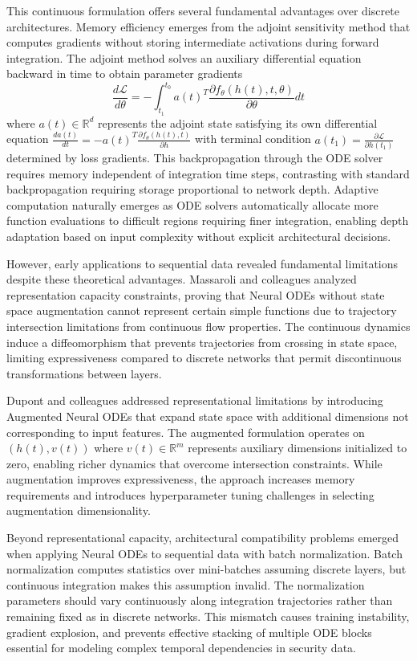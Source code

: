 \documentclass[10pt,journal,compsoc]{IEEEtran}
\newcommand{\R}{\mathbb{R}}
\begin{document}
This continuous formulation offers several fundamental advantages over discrete architectures. Memory efficiency emerges from the adjoint sensitivity method that computes gradients without storing intermediate activations during forward integration. The adjoint method solves an auxiliary differential equation backward in time to obtain parameter gradients
\begin{equation}
\frac{d\mathcal{L}}{d\theta} = -\int_{t_1}^{t_0} a(t)^T \frac{\partial f_\theta(h(t), t, \theta)}{\partial \theta} dt
\label{eq:adjoint_gradient}
\end{equation}
where $a(t) \in \R^d$ represents the adjoint state satisfying its own differential equation $\frac{da(t)}{dt} = -a(t)^T \frac{\partial f_\theta(h(t), t)}{\partial h}$ with terminal condition $a(t_1) = \frac{\partial \mathcal{L}}{\partial h(t_1)}$ determined by loss gradients. This backpropagation through the ODE solver requires memory independent of integration time steps, contrasting with standard backpropagation requiring storage proportional to network depth. Adaptive computation naturally emerges as ODE solvers automatically allocate more function evaluations to difficult regions requiring finer integration, enabling depth adaptation based on input complexity without explicit architectural decisions.

However, early applications to sequential data revealed fundamental limitations despite these theoretical advantages. Massaroli and colleagues analyzed representation capacity constraints, proving that Neural ODEs without state space augmentation cannot represent certain simple functions due to trajectory intersection limitations from continuous flow properties. The continuous dynamics induce a diffeomorphism that prevents trajectories from crossing in state space, limiting expressiveness compared to discrete networks that permit discontinuous transformations between layers.

Dupont and colleagues addressed representational limitations by introducing Augmented Neural ODEs that expand state space with additional dimensions not corresponding to input features. The augmented formulation operates on $(h(t), v(t))$ where $v(t) \in \R^m$ represents auxiliary dimensions initialized to zero, enabling richer dynamics that overcome intersection constraints. While augmentation improves expressiveness, the approach increases memory requirements and introduces hyperparameter tuning challenges in selecting augmentation dimensionality.

Beyond representational capacity, architectural compatibility problems emerged when applying Neural ODEs to sequential data with batch normalization. Batch normalization computes statistics over mini-batches assuming discrete layers, but continuous integration makes this assumption invalid. The normalization parameters should vary continuously along integration trajectories rather than remaining fixed as in discrete networks. This mismatch causes training instability, gradient explosion, and prevents effective stacking of multiple ODE blocks essential for modeling complex temporal dependencies in security data.
\end{document}
